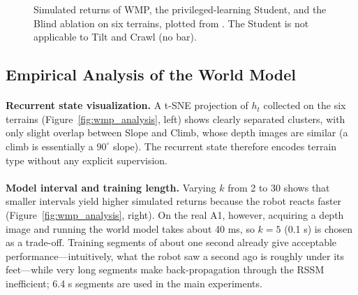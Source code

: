 \documentclass[12pt,a4paper,final]{extreport}
\begin{document}
\begin{figure}[htbp]
\centering
{}
\caption{Simulated returns of WMP, the privileged-learning Student, and the Blind ablation on six terrains, plotted from \cite{p3}. The Student is not applicable to Tilt and Crawl (no bar).}
\label{fig:wmp_chart}
\end{figure}

\subsection{Empirical Analysis of the World Model}

\paragraph{} \textbf{Recurrent state visualization.} A t-SNE projection of $h_t$ collected on the six terrains (Figure~\ref{fig:wmp_analysis}, left) shows clearly separated clusters, with only slight overlap between Slope and Climb, whose depth images are similar (a climb is essentially a $90^{\circ}$ slope). The recurrent state therefore encodes terrain type without any explicit supervision.

\paragraph{} \textbf{Model interval and training length.} Varying $k$ from 2 to 30 shows that smaller intervals yield higher simulated returns because the robot reacts faster (Figure~\ref{fig:wmp_analysis}, right). On the real A1, however, acquiring a depth image and running the world model takes about 40 ms, so $k=5$ (0.1 s) is chosen as a trade-off. Training segments of about one second already give acceptable performance---intuitively, what the robot saw a second ago is roughly under its feet---while very long segments make back-propagation through the RSSM inefficient; 6.4 s segments are used in the main experiments.
\end{document}
